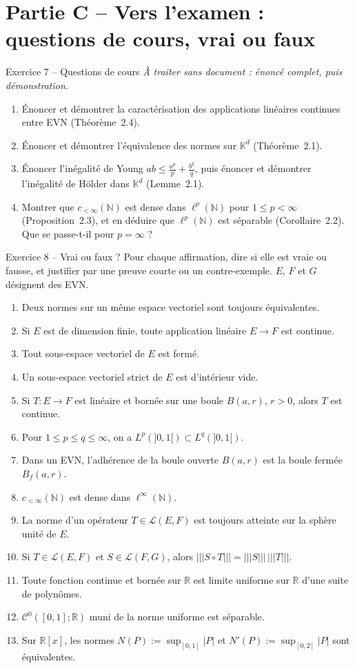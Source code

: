 \documentclass[11pt,a4paper]{article}
\newcommand{\R}{\mathbb{R}}
\newcommand{\N}{\mathbb{N}}
\newcommand{\K}{\mathbb{K}}
\newcommand{\Bf}{B_f}
\newcommand{\opnorm}[1]{|\!|\!|#1|\!|\!|}
\newcommand{\Lc}{\mathcal{L}}
\newcommand{\Cz}{\mathcal{C}^0}
\theoremstyle{definition}
\begin{document}
\section*{Partie C -- Vers l'examen : questions de cours, vrai ou faux}

\begin{exo}{Exercice 7 -- Questions de cours}
\emph{À traiter sans document : énoncé complet, puis démonstration.}
\begin{enumerate}[label=(\alph*)]
  \item Énoncer et démontrer la caractérisation des applications linéaires continues entre EVN (Théorème~2.4).
  \item Énoncer et démontrer l'équivalence des normes sur $\K^d$ (Théorème~2.1).
  \item Énoncer l'inégalité de Young $ab\le\frac{a^p}p+\frac{b^q}q$, puis énoncer et démontrer l'inégalité de Hölder dans $\K^d$ (Lemme~2.1).
  \item Montrer que $c_{<\infty}(\N)$ est dense dans $\ell^p(\N)$ pour $1\le p<\infty$ (Proposition~2.3), et en déduire que $\ell^p(\N)$ est séparable (Corollaire~2.2). Que se passe-t-il pour $p=\infty$ ?
\end{enumerate}
\end{exo}

\begin{exo}{Exercice 8 -- Vrai ou faux ?}
Pour chaque affirmation, dire si elle est vraie ou fausse, et justifier par une preuve courte ou un contre-exemple. $E$, $F$ et $G$ désignent des EVN.
\begin{enumerate}[label=\arabic*.]
  \item Deux normes sur un même espace vectoriel sont toujours équivalentes.
  \item Si $E$ est de dimension finie, toute application linéaire $E\to F$ est continue.
  \item Tout sous-espace vectoriel de $E$ est fermé.
  \item Un sous-espace vectoriel strict de $E$ est d'intérieur vide.
  \item Si $T:E\to F$ est linéaire et bornée sur une boule $B(a,r)$, $r>0$, alors $T$ est continue.
  \item Pour $1\le p\le q\le\infty$, on a $L^p(]0,1[)\subset L^q(]0,1[)$.
  \item Dans un EVN, l'adhérence de la boule ouverte $B(a,r)$ est la boule fermée $\Bf(a,r)$.
  \item $c_{<\infty}(\N)$ est dense dans $\ell^\infty(\N)$.
  \item La norme d'un opérateur $T\in\Lc(E,F)$ est toujours atteinte sur la sphère unité de $E$.
  \item Si $T\in\Lc(E,F)$ et $S\in\Lc(F,G)$, alors $\opnorm{S\circ T}=\opnorm S\,\opnorm T$.
  \item Toute fonction continue et bornée sur $\R$ est limite uniforme sur $\R$ d'une suite de polynômes.
  \item $\Cz([0,1];\R)$ muni de la norme uniforme est séparable.
  \item Sur $\R[x]$, les normes $N(P):=\sup_{[0,1]}|P|$ et $N'(P):=\sup_{[0,2]}|P|$ sont équivalentes.
\end{enumerate}
\end{exo}
\end{document}
